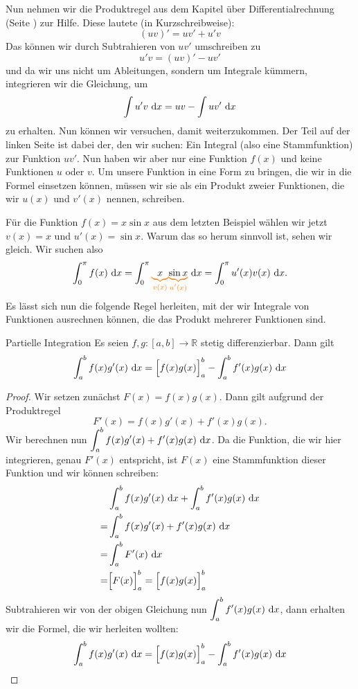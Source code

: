 \documentclass[../../main.tex]{subfiles}
\begin{document}
Nun nehmen wir die Produktregel aus dem Kapitel über Differentialrechnung (Seite \pageref{produktregel}) zur Hilfe. Diese lautete 
(in Kurzschreibweise):
\[(uv)'=uv'+u'v\]
Das können wir durch Subtrahieren von $uv'$ umschreiben zu
\[u'v=(uv)'-uv'\]
und da wir uns nicht um Ableitungen, sondern um Integrale kümmern, integrieren wir die Gleichung, um
\[\int u'v\mathop{}\mathrm{d} x=uv-\int uv'\mathop{}\mathrm{d} x\]
zu erhalten. Nun können wir versuchen, damit weiterzukommen. Der Teil auf der linken Seite ist dabei der, den wir 
suchen: Ein Integral (also eine Stammfunktion) zur Funktion $uv'$. Nun haben wir aber nur eine Funktion $f(x)$ und keine 
Funktionen $u$ oder $v$. Um unsere Funktion in eine Form zu bringen, die wir in die Formel einsetzen können, müssen 
wir sie als ein Produkt zweier Funktionen, die wir $u(x)$ und $v'(x)$ nennen, schreiben.
\begin{example}{}
    Für die Funktion $f(x)=x\sin x$ aus dem letzten Beispiel wählen wir jetzt $v(x)=x$ und $u'(x)=\sin x$. 
    Warum das so herum sinnvoll ist, sehen wir gleich. Wir suchen also
    \[\int_0^\pi f(x)\diff x=\int_0^\pi\colorbrace{x}{v(x)}\colorbrace{\sin x}{u'(x)}\diff x=\int_0^\pi u'(x)v(x)\diff x.\]
\end{example}
Es lässt sich nun die folgende Regel herleiten, mit der wir Integrale von Funktionen ausrechnen können, die das Produkt
mehrerer Funktionen sind.
\begin{theorem}{Partielle Integration}
    Es seien $f,g:[a,b]\rightarrow\mathbb{R}$ stetig differenzierbar. Dann gilt
    \[\int_a^b f(x)g'(x)\mathop{}\mathrm{d} x=\Bigl[f(x)g(x)\Bigr]_a^b-\int_a^b f'(x)g(x)\mathop{}\mathrm{d} x\]
\end{theorem}
\begin{proof}
    Wir setzen zunächst $F(x)=f(x)g(x)$. Dann gilt aufgrund der Produktregel \[F'(x)=f(x)g'(x)+f'(x)g(x).\] 
    Wir berechnen nun $\displaystyle\int_a^b f(x)g'(x)+f'(x)g(x)\mathop{}\mathrm{d} x$. Da die Funktion, die wir hier integrieren, 
    genau $F'(x)$ entspricht, ist $F(x)$ eine Stammfunktion dieser Funktion und wir können schreiben:
    \begin{align*}
        &\int_a^b f(x)g'(x)\mathop{}\mathrm{d} x+\int_a^b f'(x)g(x)\mathop{}\mathrm{d} x\\
        =&\int_a^b f(x)g'(x)+f'(x)g(x)\mathop{}\mathrm{d} x\\
        =&\int_a^b F'(x)\mathop{}\mathrm{d} x\\
        =&\Bigl[F(x)\Bigr]_a^b=\Bigl[f(x)g(x)\Bigr]_a^b
    \end{align*}
    Subtrahieren wir von der obigen Gleichung nun $\displaystyle\int_a^b f'(x)g(x)\mathop{}\mathrm{d} x$, dann erhalten wir die Formel,
    die wir herleiten wollten:
    \[\int_a^b f(x)g'(x)\mathop{}\mathrm{d} x=\Bigl[f(x)g(x)\Bigr]_a^b-\int_a^b f'(x)g(x)\mathop{}\mathrm{d} x\qedhere\]
\end{proof}
\end{document}
